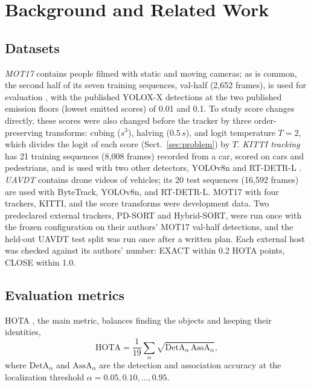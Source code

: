 \documentclass[pdflatex,sn-mathphys-num,iicol]{sn-jnl}
\begin{document}
\section{Background and Related Work}\label{sec:related}

\subsection{Datasets}\label{sec:data}
\emph{MOT17} \cite{milan2016mot16} contains people filmed with static and moving cameras; as is
common, the second half of its seven training sequences, val-half (2,652 frames), is used for
evaluation \cite{zhang2022bytetrack}, with the published YOLOX-X detections \cite{ge2021yolox} at the
two published emission floors (lowest emitted scores) of 0.01 and 0.1. To study score changes
directly, these scores were also changed before the tracker by three order-preserving transforms:
cubing ($s^3$), halving ($0.5\,s$), and logit temperature $T=2$, which divides the logit
of each score (Sect.~\ref{sec:problem}) by $T$. \emph{KITTI tracking} \cite{geiger2012kitti} has 21
training sequences (8,008 frames) recorded from a car, scored on cars and pedestrians, and is used
with two other detectors, YOLOv8n \cite{jocher2023yolov8} and RT-DETR-L \cite{zhao2024rtdetr}.
\emph{UAVDT} \cite{du2018uavdt} contains drone videos of vehicles; its 20 test sequences (16,592
frames) are used with ByteTrack, YOLOv8n, and RT-DETR-L. MOT17 with four trackers, KITTI, and the
score transforms were development data. Two predeclared external trackers, PD-SORT and Hybrid-SORT,
were run once with the frozen configuration on their authors' MOT17 val-half detections, and the
held-out UAVDT test split was run once after a written plan. Each external host was checked against
its authors' number: EXACT within 0.2 HOTA points, CLOSE within 1.0.

\subsection{Evaluation metrics}\label{sec:metrics}
HOTA \cite{luiten2021hota}, the main metric, balances finding the objects and keeping their
identities,
\begin{equation}
\mathrm{HOTA}=\frac{1}{19}\sum_{\alpha}\sqrt{\mathrm{DetA}_\alpha\,\mathrm{AssA}_\alpha},
\label{eq:hota}
\end{equation}
where $\mathrm{DetA}_\alpha$ and $\mathrm{AssA}_\alpha$ are the detection and association accuracy
at the localization threshold $\alpha=0.05,0.10,\dots,0.95$.
\end{document}
